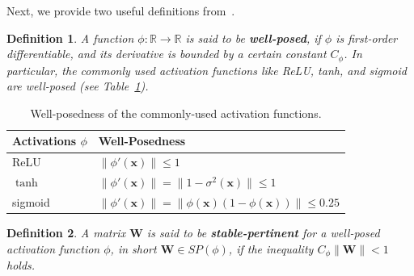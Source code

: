 \documentclass[review,10pt]{JMtemplate}
\newtheorem{definition}{Definition}
\begin{document}
Next, we provide two useful definitions from~\citep{zhang2022:NNGP}.
\begin{definition} \label{def:well_posed}
A  function $\phi:\mathbb{R}\to\mathbb{R}$ is said to be \textbf{well-posed}, if $\phi$ is first-order differentiable, and its derivative is bounded by a certain constant $C_{\phi}$. In particular, the commonly used activation functions like ReLU, tanh, and sigmoid are well-posed (see Table~\ref{tab:activation}).
\end{definition}
\begin{table}[!htb]
	\centering
	\caption{Well-posedness of the commonly-used activation functions.}
	\label{tab:activation}
	\begin{tabular}{l|l}
		\toprule
		Activations $\phi$ & Well-Posedness  \\ \midrule
		ReLU & $\|\phi'(\boldsymbol{x})\| \leq 1$ \\ \midrule
		$\tanh$     & $\|\phi'(\boldsymbol{x})\| = \| 1- \sigma^2(\boldsymbol{x}) \| \leq 1$  \\ \midrule
		sigmoid  & $\|\phi'(\boldsymbol{x})\| = \| \phi(\boldsymbol{x})(1- \phi(\boldsymbol{x})) \| \leq 0.25$  \\ \bottomrule
	\end{tabular} 
\end{table}
\begin{definition} \label{def:stable_pertinent}
A matrix $\mathbf{W}$ is said to be \textbf{stable-pertinent} for a well-posed activation function $\phi$, in short $\mathbf{W} \in SP(\phi)$, if the inequality $C_{\phi} \|\mathbf{W}\| < 1$ holds.
\end{definition}
\end{document}
